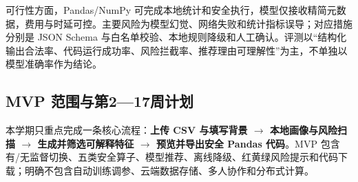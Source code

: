 \documentclass[UTF8,12pt,a4paper]{ctexart}
\begin{document}
可行性方面，Pandas/NumPy 可完成本地统计和安全执行，模型仅接收精简元数据，费用与时延可控。主要风险为模型幻觉、网络失败和统计指标误导；对应措施分别是 JSON Schema 与白名单校验、本地规则降级和人工确认。评测以“结构化输出合法率、代码运行成功率、风险拦截率、推荐理由可理解性”为主，不单独以模型准确率作为结论。

\subsection{MVP 范围与第2—17周计划}

本学期只重点完成一条核心流程：\textbf{上传 CSV 与填写背景 $\rightarrow$ 本地画像与风险扫描 $\rightarrow$ 生成并筛选可解释特征 $\rightarrow$ 预览并导出安全 Pandas 代码}。MVP 包含有/无监督切换、五类安全算子、模型推荐、离线降级、红黄绿风险提示和代码下载；明确不包含自动训练调参、云端数据存储、多人协作和分布式计算。
\end{document}
